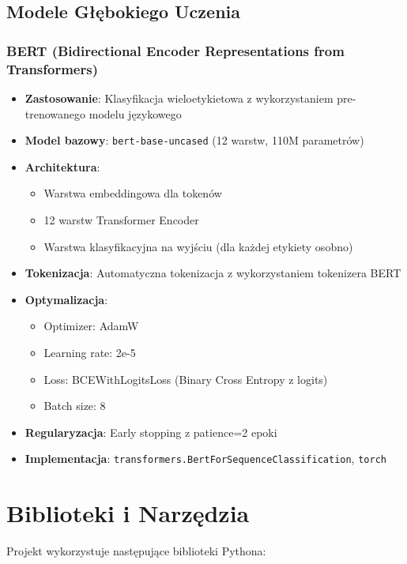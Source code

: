 \documentclass[12pt,a4paper]{article}
\begin{document}
\subsection{Modele Głębokiego Uczenia}

\subsubsection{BERT (Bidirectional Encoder Representations from Transformers)}
\begin{itemize}
    \item \textbf{Zastosowanie}: Klasyfikacja wieloetykietowa z wykorzystaniem pre-trenowanego modelu językowego
    \item \textbf{Model bazowy}: \texttt{bert-base-uncased} (12 warstw, 110M parametrów)
    \item \textbf{Architektura}: 
    \begin{itemize}
        \item Warstwa embeddingowa dla tokenów
        \item 12 warstw Transformer Encoder
        \item Warstwa klasyfikacyjna na wyjściu (dla każdej etykiety osobno)
    \end{itemize}
    \item \textbf{Tokenizacja}: Automatyczna tokenizacja z wykorzystaniem tokenizera BERT
    \item \textbf{Optymalizacja}: 
    \begin{itemize}
        \item Optimizer: AdamW
        \item Learning rate: 2e-5
        \item Loss: BCEWithLogitsLoss (Binary Cross Entropy z logits)
        \item Batch size: 8
    \end{itemize}
    \item \textbf{Regularyzacja}: Early stopping z patience=2 epoki
    \item \textbf{Implementacja}: \texttt{transformers.BertForSequenceClassification}, \texttt{torch}
\end{itemize}

\section{Biblioteki i Narzędzia}

Projekt wykorzystuje następujące biblioteki Pythona:
\end{document}
